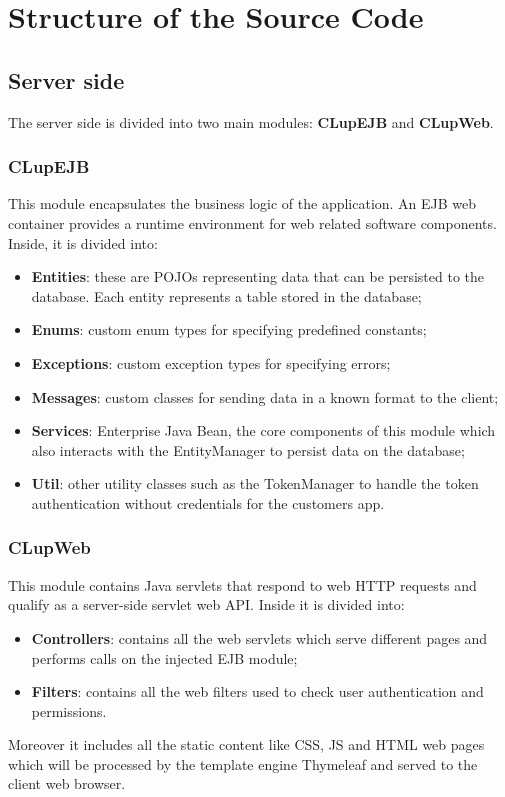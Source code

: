 \chapter{Structure of the Source Code}

\section{Server side}
The server side is divided into two main modules: \textbf{CLupEJB} and \textbf{CLupWeb}.

\subsection{CLupEJB}
This module encapsulates the business logic of the application. An EJB web container provides a runtime environment for web related software components. Inside, it is divided into:
\begin{itemize}
	\item \textbf{Entities}: these are POJOs representing data that can be persisted to the database. Each entity represents a table stored in the database;
	\item \textbf{Enums}: custom enum types for specifying predefined constants;
	\item \textbf{Exceptions}: custom exception types for specifying errors;
	\item \textbf{Messages}: custom classes for sending data in a known format to the client;
	\item \textbf{Services}: Enterprise Java Bean, the core components of this module which also interacts with the EntityManager to persist data on the database;
	\item \textbf{Util}: other utility classes such as the TokenManager to handle the token authentication without credentials for the customers app.
\end{itemize}

\subsection{CLupWeb}
This module contains Java servlets that respond to web HTTP requests and qualify as a server-side servlet web API. Inside it is divided into:
\begin{itemize}
	\item \textbf{Controllers}: contains all the web servlets which serve different pages and performs calls on the injected EJB module;
	\item \textbf{Filters}: contains all the web filters used to check user authentication and permissions.
\end{itemize}
Moreover it includes all the static content like CSS, JS and HTML web pages which will be processed by the template engine Thymeleaf and served to the client web browser.


